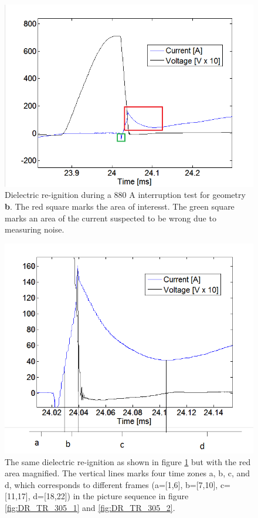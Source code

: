 \documentclass[10pt,b5paper,twoside]{article}
\begin{document}
\begin{figure}[H]
\centering
\includegraphics[scale=0.55]{Bilder/Results/DRplot_calc_areas.png}
\caption{Dielectric re-ignition during a 880 A interruption test for geometry \textbf{b}. The red square marks the area of interesst. The green square marks an area of the current suspected to be wrong due to measuring noise.} \label{fig:DR_disc_calc_areas}
\end{figure}

\begin{figure}[H]
\centering
\includegraphics[scale=0.55]{Bilder/Results/DRplot2_zoom.PNG}
\caption{The same dielectric re-ignition as shown in figure \ref{fig:DR_disc_calc_areas} but with the red area magnified. The vertical lines marks four time zones a, b, c, and d, which corresponds to different frames (a=[1,6], b=[7,10], c=[11,17], d=[18,22]) in the picture sequence in figure \ref{fig:DR_TR_305_1} and \ref{fig:DR_TR_305_2}.}
\label{fig:DR_zoom_and_areas}
\end{figure}
\end{document}
